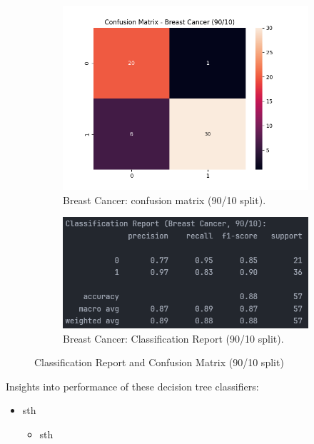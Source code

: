 \begin{figure}[H]
	\centering
	\begin{subfigure}{0.45\textwidth}
		\centering
		\includegraphics[width=\textwidth]{imgs/confusion_mat/confusion_mat__breast_cancer__90_vs_10.png}
		\caption{Breast Cancer: confusion matrix (90/10 split).}\label{fig:bc-cm-90-10}
	\end{subfigure}
	\hfill
	\begin{subfigure}{0.45\textwidth}
		\centering
		\includegraphics[width=\textwidth]{imgs/confusion_mat/class_rp__breast_cancer__90_vs_10.png}
		\caption{Breast Cancer: Classification Report (90/10 split).}\label{fig:bc-cr-90-10}
	\end{subfigure}

	\caption{Classification Report and Confusion Matrix (90/10 split)}\label{fig:bc-eval-90-10}
\end{figure}
\begin{flushleft}
	Insights into performance of these decision tree classifiers:
	\begin{itemize}
		\item sth
		      \begin{itemize}
			      \item sth
		      \end{itemize}
	\end{itemize}
\end{flushleft}

